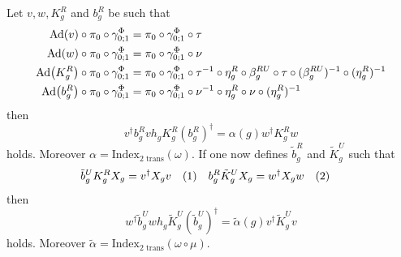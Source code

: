 \documentclass[11pt,a4paper,twoside]{article}
\numberwithin{equation}{section}
\begin{document}
	\begin{lemma}
		Let $v,w,K_g^R$ and $b_g^R$ be such that
		\begin{align}
			\Ad{v}\circ\pi_0\circ\gamma^\Phi_{0;1}&=\pi_0\circ\gamma^\Phi_{0;1}\circ\tau\\
			\Ad{w}\circ\pi_0\circ\gamma^\Phi_{0;1}&=\pi_0\circ\gamma^\Phi_{0;1}\circ\nu\\
			\Ad{K_g^R}\circ\pi_0\circ\gamma^\Phi_{0;1}&=\pi_0\circ\gamma^\Phi_{0;1}\circ\tau^{-1}\circ\eta_g^R\circ\beta_g^{RU}\circ\tau\circ(\beta_g^{RU})^{-1}\circ(\eta_g^R)^{-1}\\
			\Ad{b_g^R}\circ\pi_0\circ\gamma^\Phi_{0;1}&=\pi_0\circ\gamma^\Phi_{0;1}\circ\nu^{-1}\circ\eta_g^R\circ\nu\circ(\eta_g^R)^{-1}
		\end{align}
		then
		\begin{equation}\label{eq:H^1IndexRotationInvariantHorizontalIndex}
			v^\dagger b_g^R vh_g K_g^R (b_g^R)^\dagger=\alpha(g)w^\dagger K_g^R w
		\end{equation}
		holds. Moreover $\alpha=\textrm{Index}_{\text{2 trans}}(\omega)$. If one now defines $\tilde{b}_g^R$ and $\tilde{K}_g^U$ such that
		\begin{align*}
			\tilde{b}_g^UK_g^R X_g&=v^\dagger X_g v\Label{eq:H^1IndexRotationInvariantFirstDefinition}&b_g^R\tilde{K}_g^UX_g&=w^\dagger X_g w\Label{eq:H^1IndexRotationInvariantSecondDefinition}
		\end{align*}
		then
		\begin{equation}\label{eq:H^1IndexRotationInvariantVerticalIndex}
			w^\dagger \tilde b_g^U wh_g \tilde K_g^U (\tilde b_g^U)^\dagger=\tilde\alpha(g)v^\dagger \tilde K_g^U v
		\end{equation}
		holds. Moreover $\tilde\alpha=\textrm{Index}_{\text{2 trans}}(\omega\circ\mu)$.
	\end{lemma}
\end{document}

